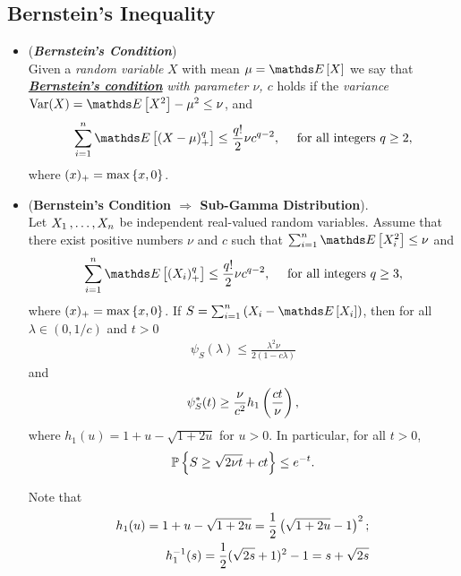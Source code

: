 \documentclass[11pt]{article}
\begin{document}
\subsection{Bernstein's Inequality}
\begin{itemize}
\item \begin{definition} (\textbf{\emph{Bernstein's Condition}}) \\
Given a \emph{random variable} $X$ with mean $\mu = \E{}{X}$ we say that \underline{\emph{\textbf{Bernstein's condition}}} \emph{with parameter $\nu$, $c$} holds if the \emph{variance} $\text{Var}(X) = \E{}{X^2} - \mu^2 \le \nu$, and
\begin{align*}
\sum_{i=1}^{n}\E{}{(X - \mu)_{+}^q} \le \frac{q!}{2} \nu c^{q-2}, \quad \text{ for all integers }q \ge 2,
\end{align*} where $(x)_{+} = \max\left\{x, 0\right\}$. 
\end{definition}

\item \begin{proposition}  (\textbf{Bernstein's Condition $\Rightarrow$  Sub-Gamma Distribution}).  \citep{boucheron2013concentration}\\
Let $X_1 \,{,}\ldots{,}\, X_n$ be independent real-valued random variables. Assume that there exist positive numbers  $\nu$ and $c$ such that
$\sum_{i=1}^{n}\E{}{X_i^2} \le \nu$ and
\begin{align*}
\sum_{i=1}^{n}\E{}{(X_i)_{+}^q} \le \frac{q!}{2} \nu c^{q-2}, \quad \text{ for all integers }q \ge 3,
\end{align*} where $(x)_{+} = \max\left\{x, 0\right\}$. If $S = \sum_{i=1}^{n}\paren{X_i - \E{}{X_i}}$, then for all $\lambda \in (0, 1/c)$ and $t > 0$
\begin{align*}
\psi_S(\lambda) \le \frac{\lambda^2 \nu}{2(1 - c\lambda)} 
\end{align*} and
\begin{align*}
\psi_S^{*}(t) \ge \frac{\nu}{c^2}h_1\left(\frac{ct}{\nu}\right),
\end{align*} where $h_1(u) = 1+ u - \sqrt{1 + 2u}$ for $u >0$. In particular, for all $t > 0$, 
\begin{align}
{\mathbb P}\left\{S \ge \sqrt{2\nu t} + ct \right\} \le e^{-t}. \label{ineqn: bernstein_inequality_gammar_dist_0}
\end{align}
\end{proposition}

\begin{remark} Note that 
\begin{align*}
h_1(u) = 1+ u - \sqrt{1 + 2u} = \frac{1}{2}\left(\sqrt{1 + 2u} - 1\right)^2; \\
h_1^{-1}(s) = \frac{1}{2}(\sqrt{2s} + 1)^2 - 1 = s + \sqrt{2s}
\end{align*}
\end{remark}


\end{itemize}
\end{document}

